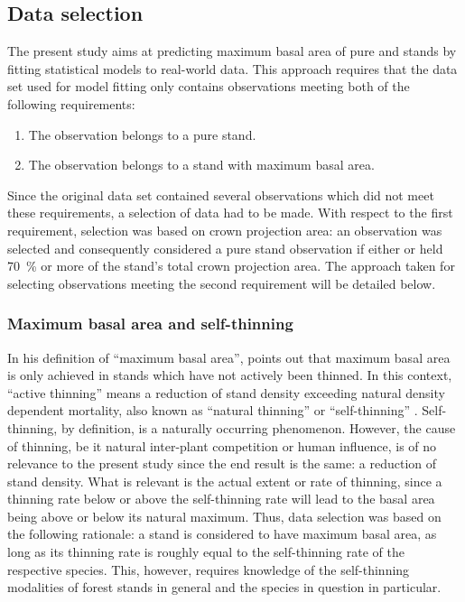 \subsection{Data selection}
The present study aims at predicting maximum basal area of pure \beech{} and \spruce{} stands by fitting statistical models to real-world data.  This approach requires that the data set used for model fitting only contains observations meeting both of the following requirements:
\begin{enumerate}
\item The observation belongs to a pure stand.
\item The observation belongs to a stand with maximum basal area.
\end{enumerate}
Since the original data set contained several observations which did not meet these requirements, a selection of data had to be made.  With respect to the first requirement, selection was based on crown projection area: an observation was selected and consequently considered a pure stand observation if either \beech{} or \spruce{} held \SI{70}{\percent} or more of the stand’s total crown projection area.
The approach taken for selecting observations meeting the second requirement will be detailed below.

\subsubsection{Maximum basal area and self-thinning}

In his definition of ``maximum basal area'', \textcite{Assmann1970} points out that maximum basal area is only achieved in stands which have not actively been thinned.  In this context, ``active thinning'' means a reduction of stand density exceeding natural density dependent mortality, also known as ``natural thinning'' \parencite{SAF1958} or ``self-thinning'' \parencite{Roehrig1992}.  Self-thinning, by definition, is a naturally occurring phenomenon.  However, the cause of thinning, be it natural inter-plant competition or human influence, is of no relevance to the present study since the end result is the same: a reduction of stand density.  What is relevant is the actual extent or rate of thinning, since a thinning rate below or above the self-thinning rate will lead to the basal area being above or below its natural maximum.  Thus, data selection was based on the following rationale: a stand is considered to have maximum basal area, as long as its thinning rate is roughly equal to the self-thinning rate of the respective species.  This, however, requires knowledge of the self-thinning modalities of forest stands in general and the species in question in particular.

